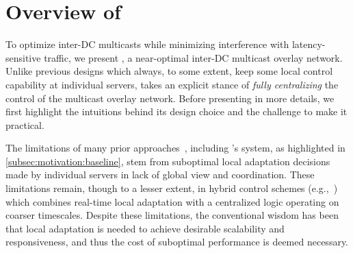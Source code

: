 \section{Overview of \name}
\label{sec:overview}

To optimize inter-DC multicasts while minimizing
interference with latency-sensitive traffic, we present {\em \name},
a near-optimal inter-DC multicast overlay network.
Unlike previous designs which always, to some extent, keep
some local control capability at individual servers,
\name takes an explicit stance of {\em fully centralizing} the
control of the multicast overlay network.
Before presenting \name in more details,
we first highlight the intuitions behind its design
choice and the challenge to make it practical.







The limitations of many prior approaches~\cite{??,??}, including \company's
system, as highlighted in \Section\ref{subsec:motivation:baseline},
stem from suboptimal local adaptation decisions made by individual servers
in lack of global view and coordination.
These limitations remain, though to a lesser extent, in hybrid
control schemes (e.g.,~\cite{yin2009design, cite Vdn at sigcomm2013}) 
which combines real-time local adaptation with a centralized logic
operating on coarser timescales.
Despite these limitations, the
conventional wisdom has
been that local adaptation is needed to achieve desirable
scalability and responsiveness, and thus the cost of suboptimal
performance is deemed necessary.

